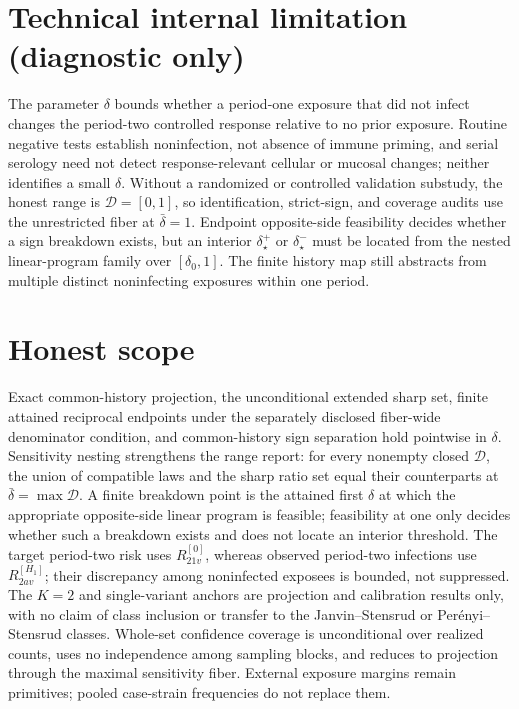 \documentclass{article}
\begin{document}
\section*{Technical internal limitation (diagnostic only)}

The parameter \(\delta\) bounds whether a period-one exposure that did not infect changes the period-two controlled response relative to no prior exposure. Routine negative tests establish noninfection, not absence of immune priming, and serial serology need not detect response-relevant cellular or mucosal changes; neither identifies a small \(\delta\). Without a randomized or controlled validation substudy, the honest range is \(\mathcal D=[0,1]\), so identification, strict-sign, and coverage audits use the unrestricted fiber at \(\bar\delta=1\). Endpoint opposite-side feasibility decides whether a sign breakdown exists, but an interior \(\delta_\star^+\) or \(\delta_\star^-\) must be located from the nested linear-program family over \([\delta_0,1]\). The finite history map still abstracts from multiple distinct noninfecting exposures within one period.

\section{Honest scope}

Exact common-history projection, the unconditional extended sharp set, finite attained reciprocal endpoints under the separately disclosed fiber-wide denominator condition, and common-history sign separation hold pointwise in \(\delta\). Sensitivity nesting strengthens the range report: for every nonempty closed \(\mathcal D\), the union of compatible laws and the sharp ratio set equal their counterparts at \(\bar\delta=\max\mathcal D\). A finite breakdown point is the attained first \(\delta\) at which the appropriate opposite-side linear program is feasible; feasibility at one only decides whether such a breakdown exists and does not locate an interior threshold. The target period-two risk uses \(R^{[0]}_{21v}\), whereas observed period-two infections use \(R^{[H_1]}_{2av}\); their discrepancy among noninfected exposees is bounded, not suppressed. The \(K=2\) and single-variant anchors are projection and calibration results only, with no claim of class inclusion or transfer to the Janvin--Stensrud or Perényi--Stensrud classes. Whole-set confidence coverage is unconditional over realized counts, uses no independence among sampling blocks, and reduces to projection through the maximal sensitivity fiber. External exposure margins remain primitives; pooled case-strain frequencies do not replace them.
\end{document}
